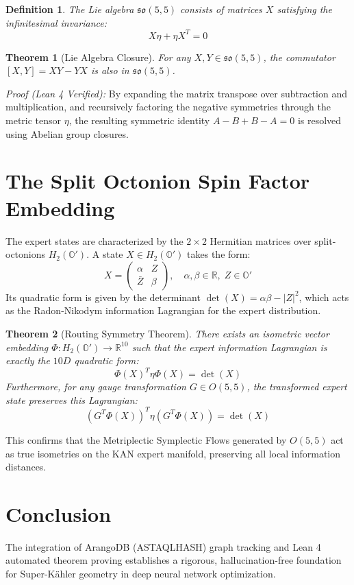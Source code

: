 \documentclass[12pt,a4paper]{article}
\newtheorem{theorem}{Theorem}
\newtheorem{definition}{Definition}
\begin{document}
\begin{definition}
The Lie algebra $\mathfrak{so}(5,5)$ consists of matrices $X$ satisfying the infinitesimal invariance:
\begin{equation}
X \eta + \eta X^T = 0
\end{equation}
\end{definition}

\begin{theorem}[Lie Algebra Closure]
For any $X, Y \in \mathfrak{so}(5,5)$, the commutator $[X, Y] = XY - YX$ is also in $\mathfrak{so}(5,5)$.
\end{theorem}
\textit{Proof (Lean 4 Verified):} By expanding the matrix transpose over subtraction and multiplication, and recursively factoring the negative symmetries through the metric tensor $\eta$, the resulting symmetric identity $A - B + B - A = 0$ is resolved using Abelian group closures.

\section{The Split Octonion Spin Factor Embedding}
The expert states are characterized by the $2 \times 2$ Hermitian matrices over split-octonions $H_2(\mathbb{O}')$. A state $X \in H_2(\mathbb{O}')$ takes the form:
\begin{equation}
X = \begin{pmatrix} \alpha & Z \\ \bar{Z} & \beta \end{pmatrix}, \quad \alpha, \beta \in \mathbb{R}, \; Z \in \mathbb{O}'
\end{equation}
Its quadratic form is given by the determinant $\det(X) = \alpha\beta - |Z|^2$, which acts as the Radon-Nikodym information Lagrangian for the expert distribution.

\begin{theorem}[Routing Symmetry Theorem]
There exists an isometric vector embedding $\Phi: H_2(\mathbb{O}') \to \mathbb{R}^{10}$ such that the expert information Lagrangian is exactly the $10D$ quadratic form:
\begin{equation}
\Phi(X)^T \eta \Phi(X) = \det(X)
\end{equation}
Furthermore, for any gauge transformation $G \in O(5,5)$, the transformed expert state preserves this Lagrangian:
\begin{equation}
(G^T \Phi(X))^T \eta (G^T \Phi(X)) = \det(X)
\end{equation}
\end{theorem}
This confirms that the Metriplectic Symplectic Flows generated by $O(5,5)$ act as true isometries on the KAN expert manifold, preserving all local information distances.

\section{Conclusion}
The integration of ArangoDB (ASTAQLHASH) graph tracking and Lean 4 automated theorem proving establishes a rigorous, hallucination-free foundation for Super-K\"ahler geometry in deep neural network optimization.
\end{document}
